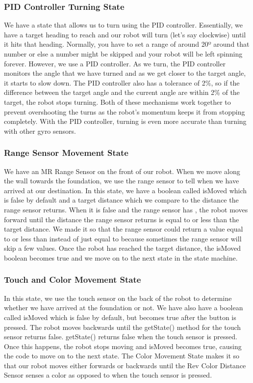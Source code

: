 \documentclass{article}
\begin{document}
\subsubsection{PID Controller Turning State}

We have a state that allows us to turn using the PID controller. Essentially, we have a target heading to reach and our robot will turn (let’s say clockwise) until it hits that heading. Normally, you have to set a range of around 20º around that number or else a number might be skipped and your robot will be left spinning forever. However, we use a PID controller. As we turn, the PID controller monitors the angle that we have turned and as we get closer to the target angle, it starts to slow down. The PID controller also has a tolerance of 2\%, so if the difference between the target angle and the current angle are within 2\% of the target, the robot stops turning. Both of these mechanisms work together to prevent overshooting the turns as the robot’s momentum keeps it from stopping completely. With the PID controller, turning is even more accurate than turning with other gyro sensors. 


\subsubsection{Range Sensor Movement State}

We have an MR Range Sensor on the front of our robot. When we move along the wall towards the foundation, we use the range sensor to tell when we have arrived at our destination. In this state, we have a boolean called isMoved which is false by default  and a target distance which we compare to the distance the range sensor returns. When it is false and the range sensor has , the robot moves forward until the distance the range sensor returns is equal to or less than the target distance. We made it so that the range sensor could return a value equal to or less than instead of just equal to because sometimes the range sensor will skip a few values. Once the robot has reached the target distance, the isMoved boolean becomes true and we move on to the next state in the state machine.

\subsubsection{Touch and Color Movement State}

In this state, we use the touch sensor on the back of the robot to determine whether we have arrived at the foundation or not. We have also have a boolean called isMoved which is false by default, but becomes true after the button is pressed. The robot moves backwards until the getState() method for the touch sensor returns false. getState() returns false when the touch sensor is pressed. Once this happens, the robot stops moving and isMoved becomes true, causing the code to move on to the next state. The Color Movement State makes it so that our robot moves either forwards or backwards until the Rev Color Distance Sensor senses a color as opposed to when the touch sensor is pressed. 
\end{document}
